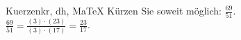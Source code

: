 \begin{MAufgabe}{Kuerzen}{kr, dh, MaTeX}
K\"urzen Sie soweit m\"oglich: $\frac{69}{51}$.\\ 
\ifLsg\MLoesung
\quad $\frac{69}{51}=\frac{(3)\cdot(23)}{(3)\cdot(17)}=\frac{23}{17}$.\else\relax\fi
 \end{MAufgabe}